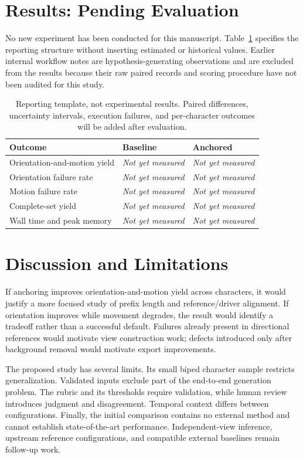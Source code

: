 \documentclass[11pt]{article}
\newcommand{\pending}{\textit{Not yet measured}}
\begin{document}
\section{Results: Pending Evaluation}
No new experiment has been conducted for this manuscript. Table~\ref{tab:results} specifies the reporting structure without inserting estimated or historical values. Earlier internal workflow notes are hypothesis-generating observations and are excluded from the results because their raw paired records and scoring procedure have not been audited for this study.

\begin{table}[ht]
\centering\small
\begin{tabularx}{\linewidth}{@{}Xll@{}}
\toprule
Outcome & Baseline & Anchored\\
\midrule
Orientation-and-motion yield & \pending & \pending\\
Orientation failure rate & \pending & \pending\\
Motion failure rate & \pending & \pending\\
Complete-set yield & \pending & \pending\\
Wall time and peak memory & \pending & \pending\\
\bottomrule
\end{tabularx}
\caption{Reporting template, not experimental results. Paired differences, uncertainty intervals, execution failures, and per-character outcomes will be added after evaluation.}\label{tab:results}
\end{table}

\section{Discussion and Limitations}
If anchoring improves orientation-and-motion yield across characters, it would justify a more focused study of prefix length and reference/driver alignment. If orientation improves while movement degrades, the result would identify a tradeoff rather than a successful default. Failures already present in directional references would motivate view construction work; defects introduced only after background removal would motivate export improvements.

The proposed study has several limits. Its small biped character sample restricts generalization. Validated inputs exclude part of the end-to-end generation problem. The rubric and its thresholds require validation, while human review introduces judgment and disagreement. Temporal context differs between configurations. Finally, the initial comparison contains no external method and cannot establish state-of-the-art performance. Independent-view inference, upstream reference configurations, and compatible external baselines remain follow-up work.
\end{document}
